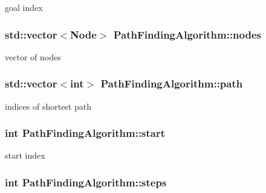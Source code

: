 goal index 

\hypertarget{classPathFindingAlgorithm_a3405321350d5fb10ba367c47944a7b77}{
\subsubsection[{nodes}]{\setlength{\rightskip}{0pt plus 5cm}std\-::vector$<${\bf Node}$>$ Path\-Finding\-Algorithm\-::nodes\hspace{0.3cm}{\ttfamily [protected]}}}\label{classPathFindingAlgorithm_a3405321350d5fb10ba367c47944a7b77}


vector of nodes 

\hypertarget{classPathFindingAlgorithm_ab177b2276cdf28fb77361bff19745b17}{
\subsubsection[{path}]{\setlength{\rightskip}{0pt plus 5cm}std\-::vector$<$int$>$ Path\-Finding\-Algorithm\-::path\hspace{0.3cm}{\ttfamily [protected]}}}\label{classPathFindingAlgorithm_ab177b2276cdf28fb77361bff19745b17}


indices of shortest path 

\hypertarget{classPathFindingAlgorithm_a1c31bd6b8c57459c32ada19cf9bf412a}{
\subsubsection[{start}]{\setlength{\rightskip}{0pt plus 5cm}int Path\-Finding\-Algorithm\-::start\hspace{0.3cm}{\ttfamily [protected]}}}\label{classPathFindingAlgorithm_a1c31bd6b8c57459c32ada19cf9bf412a}


start index 

\hypertarget{classPathFindingAlgorithm_aa4d442ba7d2499f61e81b8c0fabc55a5}{
\subsubsection[{steps}]{\setlength{\rightskip}{0pt plus 5cm}int Path\-Finding\-Algorithm\-::steps\hspace{0.3cm}{\ttfamily [protected]}}}\label{classPathFindingAlgorithm_aa4d442ba7d2499f61e81b8c0fabc55a5}



